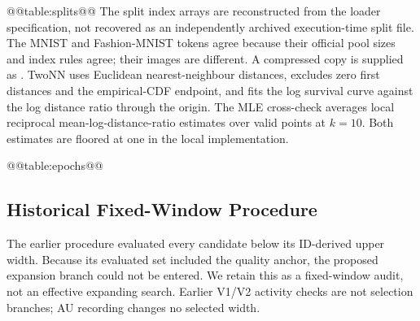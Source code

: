 @@table:splits@@
The split index arrays are reconstructed from the loader specification,
not recovered as an independently archived execution-time split file.
The MNIST and Fashion-MNIST tokens agree because their official pool
sizes and index rules agree; their images are different. A compressed
copy is supplied as .
TwoNN uses Euclidean nearest-neighbour distances, excludes zero first
distances and the empirical-CDF endpoint, and fits the log survival
curve against the log distance ratio through the origin. The MLE
cross-check averages local reciprocal mean-log-distance-ratio estimates
over valid points at $k=10$. Both estimates are floored at one in the
local implementation.

@@table:epochs@@

\subsection{Historical Fixed-Window Procedure}\label{app:legacy}
The earlier procedure evaluated every candidate below its ID-derived
upper width. Because its evaluated set included the quality anchor,
the proposed expansion branch could not be entered. We retain this as
a fixed-window audit, not an effective expanding search. Earlier V1/V2
activity checks are not selection branches; AU recording changes no
selected width.

